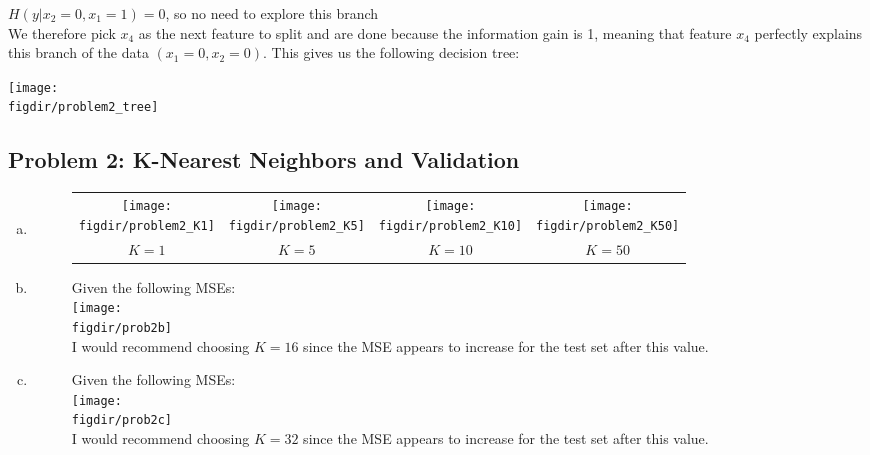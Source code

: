 \documentclass[twoside,11pt]{article}
\newcommand{\figdir}{figs}
\theoremstyle{definition}
\begin{document}
\begin{enumerate}[(a)]
$H(y|x_2=0, x_1=1) = 0$, so no need to explore this branch \\

We therefore pick $x_4$ as the next feature to split and are done because the information gain is 1, meaning that feature $x_4$ perfectly explains this branch of the data $(x_1=0,x_2=0)$.
This gives us the following decision tree:

\texttt{[image: \\figdir/problem2\_tree]}

\end{enumerate}


\subsection*{Problem 2: K-Nearest Neighbors and Validation}

\begin{enumerate}[(a)]
\item 
\begin{figure}[H] \centering
\begin{tabular}{cccc}
\texttt{[image: \\figdir/problem2\_K1]} &
\texttt{[image: \\figdir/problem2\_K5]} &
\texttt{[image: \\figdir/problem2\_K10]} &
\texttt{[image: \\figdir/problem2\_K50]} \\
$K=1$ & $K=5$ & $K=10$ & $K=50$ \\
\end{tabular}
\end{figure}

\item 
\begin{figure}[H] \centering
Given the following MSEs: \\
\vspace{-1in}
\texttt{[image: \\figdir/prob2b]} \\
\vspace{-2in}
I would recommend choosing $K=16$ since the MSE appears to increase for the test set after this value.
\end{figure}

\item 
\vspace{-1in}
\begin{figure}[H] \centering
Given the following MSEs: \\
\vspace{-1in}
\texttt{[image: \\figdir/prob2c]} \\
\vspace{-1in}
I would recommend choosing $K=32$ since the MSE appears to increase for the test set after this value.
\end{figure}

\end{enumerate}
\end{document}

